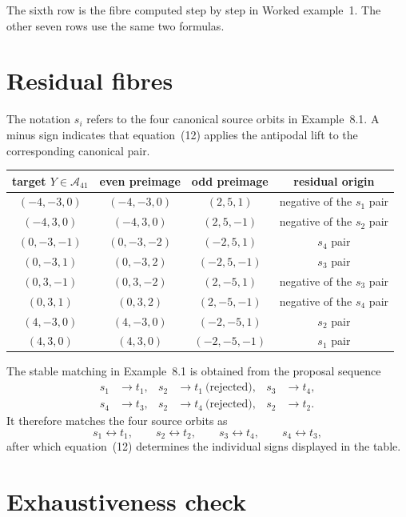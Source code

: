 \documentclass[11pt]{amsart}
\newcommand{\A}{\mathcal A_{41}}
\begin{document}
The sixth row is the fibre computed step by step in Worked example~1.  The
other seven rows use the same two formulas.

\newpage
\section*{Residual fibres}

The notation $s_i$ refers to the four canonical source orbits in
Example~8.1.  A minus sign indicates that equation~(12) applies the
antipodal lift to the corresponding canonical pair.

\begin{center}
\small
\renewcommand{\arraystretch}{1.22}
\begin{tabular}{@{}c c c c@{}}
\toprule
target $Y\in\A$ & even preimage & odd preimage & residual origin \\
\midrule
$(-4,-3,0)$ & $(-4,-3,0)$ & $(2,5,1)$
  & negative of the $s_1$ pair \\
$(-4, 3,0)$ & $(-4, 3,0)$ & $(2,5,-1)$
  & negative of the $s_2$ pair \\
$(0,-3,-1)$ & $(0,-3,-2)$ & $(-2,5,1)$
  & $s_4$ pair \\
$(0,-3, 1)$ & $(0,-3, 2)$ & $(-2,5,-1)$
  & $s_3$ pair \\
$(0, 3,-1)$ & $(0, 3,-2)$ & $(2,-5,1)$
  & negative of the $s_3$ pair \\
$(0, 3, 1)$ & $(0, 3, 2)$ & $(2,-5,-1)$
  & negative of the $s_4$ pair \\
$(4,-3,0)$ & $(4,-3,0)$ & $(-2,-5,1)$
  & $s_2$ pair \\
$(4, 3,0)$ & $(4, 3,0)$ & $(-2,-5,-1)$
  & $s_1$ pair \\
\bottomrule
\end{tabular}
\end{center}

The stable matching in Example~8.1 is obtained from the proposal sequence
\[
\begin{aligned}
 s_1&\to t_1,&
 s_2&\to t_1\ \text{(rejected)},&
 s_3&\to t_4,\\
 s_4&\to t_3,&
 s_2&\to t_4\ \text{(rejected)},&
 s_2&\to t_2.
\end{aligned}
\]
It therefore matches the four source orbits as
\[
 s_1\leftrightarrow t_1,\qquad
 s_2\leftrightarrow t_2,\qquad
 s_3\leftrightarrow t_4,\qquad
 s_4\leftrightarrow t_3,
\]
\noindent
after which equation~(12) determines the individual signs displayed in the
table.

\section*{Exhaustiveness check}
\end{document}
